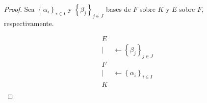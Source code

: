 \documentclass[12pt]{report}
\theoremstyle{largebreak}
\begin{document}
    \begin{proof}
        Sea $\left\{\alpha_i \right\}_{ i\in I}$ y $\left\{\beta_j \right\}_{ j\in J}$ bases de $F$ sobre $K$ y $E$ sobre $F$, respectivamente.

        \begin{equation*}
            \begin{split}
                E & \\
                | & \leftarrow \left\{\beta_j \right\}_{ j\in J} \\
                F & \\
                | & \leftarrow \left\{\alpha_i \right\}_{ i\in I}\\
                K & \\
            \end{split}
        \end{equation*}
        

\end{proof}
\end{document}
